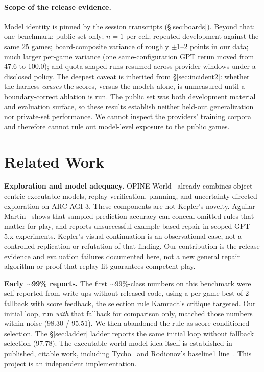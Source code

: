 \documentclass[11pt]{article}
\begin{document}
\paragraph{Scope of the release evidence.}

Model identity is pinned by the session transcripts (\S\ref{sec:boards}). Beyond that: one benchmark; public set only; $n=1$ per cell; repeated development against the same 25 games; board-composite variance of roughly $\pm$1--2 points in our data; much larger per-game variance (one same-configuration GPT rerun moved from 47.6 to 100.0); and quota-shaped runs resumed across provider windows under a disclosed policy. The deepest caveat is inherited from \S\ref{sec:incident2}: whether the harness \emph{causes} the scores, versus the models alone, is unmeasured until a boundary-correct ablation is run. The public set was both development material and evaluation surface, so these results establish neither held-out generalization nor private-set performance. We cannot inspect the providers' training corpora and therefore cannot rule out model-level exposure to the public games.

\section{Related Work}\label{sec:related}

\textbf{Exploration and model adequacy.} OPINE-World~\citep{courtis2026opine}
already combines object-centric executable models, replay verification,
planning, and uncertainty-directed exploration on ARC-AGI-3. These components
are not Kepler's novelty. Aguilar Mart\'in~\citep{aguilar2026playadequacy}
shows that sampled prediction accuracy can conceal omitted rules that matter
for play, and reports unsuccessful example-based repair in scoped GPT-5.x
experiments. Kepler's visual continuation is an observational case, not a
controlled replication or refutation of that finding. Our contribution is the
release evidence and evaluation failures documented here, not a new general
repair algorithm or proof that replay fit guarantees competent play.

\textbf{Early ${\sim}$99\% reports.} The first ${\sim}$99\%-class numbers on this benchmark were self-reported from write-ups without released code, using a per-game best-of-2 fallback with score feedback, the selection rule Kamradt's critique targeted. Our initial loop, run \emph{with} that fallback for comparison only, matched those numbers within noise (98.30 / 95.51). We then abandoned the rule as score-conditioned selection. The \S\ref{sec:ladder} ladder reports the same initial loop without fallback selection (97.78). The executable-world-model idea itself is established in published, citable work, including Tycho~\citep{tycho} and Rodionov's baseline1 line~\citep{thinharness}. This project is an independent implementation.
\end{document}
